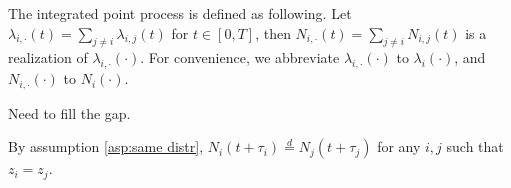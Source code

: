 The integrated point process is defined as following. 
Let $\lambda_{i,\cdot}(t)=\sum_{j\neq i}\lambda_{i,j}(t)$ for $t\in[0,T]$, then
${N}_{i,\cdot}(t)=\sum_{j\neq i}N_{i,j}(t)$ 
is a realization of $\lambda_{i,\cdot}(\cdot)$. For convenience, we abbreviate $\lambda_{i,\cdot}(\cdot)$ to $\lambda_{i}(\cdot)$, and $N_{i,\cdot}(\cdot)$ to $N_i(\cdot)$. 
\begin{assumption}\label{asp:same distr}
Need to fill the gap.
\end{assumption}
By assumption \ref{asp:same distr}, $N_i(t+\tau_i)\overset{d}{=}N_j(t+\tau_j)$ for any $i,j$ such that $z_i=z_j$.




